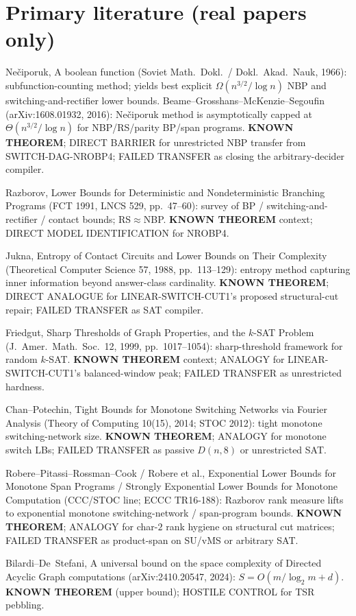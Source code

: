\documentclass[11pt]{article}
\begin{document}
\section*{Primary literature (real papers only)}
Ne\v{c}iporuk, A boolean function (Soviet Math.\ Dokl.\ / Dokl.\ Akad.\ Nauk, 1966):
subfunction-counting method; yields best explicit $\Omega(n^{3/2}/\log n)$ NBP and
switching-and-rectifier lower bounds. Beame--Grosshans--McKenzie--Segoufin
(arXiv:1608.01932, 2016): Ne\v{c}iporuk method is asymptotically capped at
$\Theta(n^{3/2}/\log n)$ for NBP/RS/parity BP/span programs.
\textbf{KNOWN THEOREM}; DIRECT BARRIER for unrestricted NBP transfer from SWITCH-DAG-NROBP4;
FAILED TRANSFER as closing the arbitrary-decider compiler.

Razborov, Lower Bounds for Deterministic and Nondeterministic Branching Programs
(FCT 1991, LNCS 529, pp.~47--60): survey of BP / switching-and-rectifier / contact bounds;
RS$\approx$NBP. \textbf{KNOWN THEOREM} context; DIRECT MODEL IDENTIFICATION for NROBP4.

Jukna, Entropy of Contact Circuits and Lower Bounds on Their Complexity
(Theoretical Computer Science 57, 1988, pp.~113--129): entropy method capturing
inner information beyond answer-class cardinality. \textbf{KNOWN THEOREM}; DIRECT ANALOGUE
for LINEAR-SWITCH-CUT1's proposed structural-cut repair; FAILED TRANSFER as SAT compiler.

Friedgut, Sharp Thresholds of Graph Properties, and the $k$-SAT Problem
(J.\ Amer.\ Math.\ Soc.\ 12, 1999, pp.~1017--1054): sharp-threshold framework for random $k$-SAT.
\textbf{KNOWN THEOREM} context; ANALOGY for LINEAR-SWITCH-CUT1's balanced-window peak;
FAILED TRANSFER as unrestricted hardness.

Chan--Potechin, Tight Bounds for Monotone Switching Networks via Fourier Analysis
(Theory of Computing 10(15), 2014; STOC 2012): tight monotone switching-network size.
\textbf{KNOWN THEOREM}; ANALOGY for monotone switch LBs; FAILED TRANSFER as passive $D(n,8)$
or unrestricted SAT.

Robere--Pitassi--Rossman--Cook / Robere et al., Exponential Lower Bounds for Monotone
Span Programs / Strongly Exponential Lower Bounds for Monotone Computation
(CCC/STOC line; ECCC TR16-188): Razborov rank measure lifts to exponential monotone
switching-network / span-program bounds. \textbf{KNOWN THEOREM}; ANALOGY for char-$2$
rank hygiene on structural cut matrices; FAILED TRANSFER as product-span on SU/vMS or
arbitrary SAT.

Bilardi--De~Stefani, A universal bound on the space complexity of Directed Acyclic Graph
computations (arXiv:2410.20547, 2024): $S=O(m/\log_2 m+d)$. \textbf{KNOWN THEOREM}
(upper bound); HOSTILE CONTROL for TSR pebbling.
\end{document}
